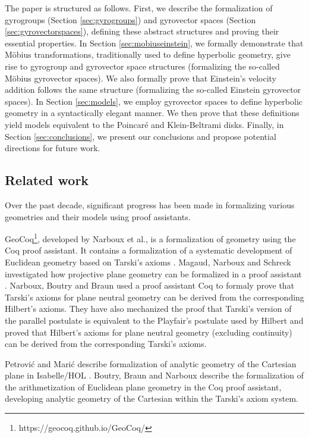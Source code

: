 \documentclass[a4paper]{article}
\theoremstyle{definition}
\begin{document}
The paper is structured as follows. First, we describe the
formalization of gyrogroups (Section \ref{sec:gyrogroups}) and
gyrovector spaces (Section \ref{sec:gyrovectorspaces}), defining these
abstract structures and proving their essential properties. In Section
\ref{sec:mobiuseinstein}, we formally demonstrate that M\"obius
transformations, traditionally used to define hyperbolic geometry,
give rise to gyrogroup and gyrovector space structures (formalizing
the so-called M\"obius gyrovector spaces). We also formally prove that
Einstein's velocity addition follows the same structure (formalizing
the so-called Einstein gyrovector spaces). In Section
\ref{sec:models}, we employ gyrovector spaces to define hyperbolic
geometry in a syntactically elegant manner. We then prove that these
definitions yield models equivalent to the Poincar\'e and
Klein-Beltrami disks. Finally, in Section \ref{sec:conclusions}, we
present our conclusions and propose potential directions for future
work.

\subsection{Related work}

Over the past decade, significant progress has been made in
formalizing various geometries and their models using proof
assistants.

GeoCoq\footnote{https://geocoq.github.io/GeoCoq/}, developed by
Narboux et al., is a formalization of geometry using the Coq proof
assistant. It contains a formalization of a systematic development of
Euclidean geometry based on Tarski's axioms
\cite{tarski,narboux-tarski}. Magaud, Narboux and Schreck investigated
how projective plane geometry can be formalized in a proof assistant
\cite{coq-projective}. Narboux, Boutry and Braun used a proof
assistant Coq to formaly prove that Tarski's axioms for plane neutral
geometry can be derived from the corresponding Hilbert's
axioms\cite{hilbert-to-tarski}. They have also mechanized the proof
that Tarski's version of the parallel postulate is equivalent to the
Playfair's postulate used by Hilbert\cite{coq-parallels} and proved
that Hilbert's axioms for plane neutral geometry (excluding
continuity) can be derived from the corresponding Tarski’s
axioms\cite{tarski-to-hilbert}.

Petrovi\'c and Mari\'c describe formalization of analytic geometry of
the Cartesian plane in Isabelle/HOL \cite{adg-analytic}. Boutry, Braun
and Narboux describe the formalization of the arithmetization of
Euclidean plane geometry in the Coq proof assistant, developing
analytic geometry of the Cartesian within the Tarski's axiom
system\cite{aritmetization}.
\end{document}
